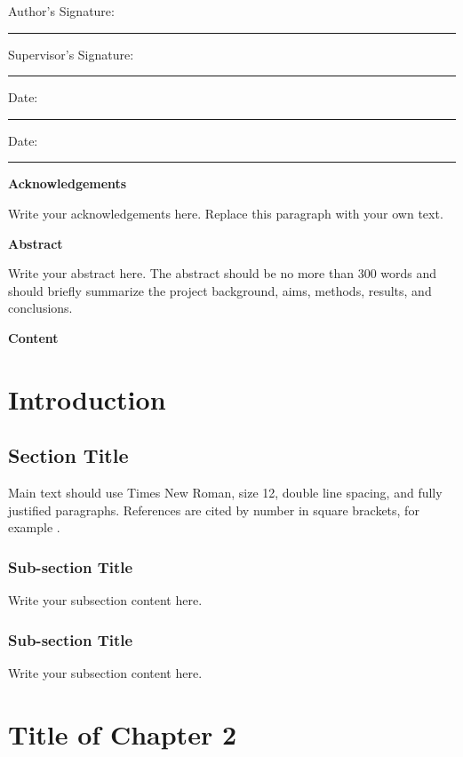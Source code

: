 \documentclass[12pt,a4paper]{report}
\newcommand{\fronttitle}[1]{%
  \clearpage
  \begin{center}
    {\bfseries\fontsize{24}{28}\selectfont #1}
  \end{center}
  \vspace{1em}
}
\newcommand{\signatureline}[1]{%
  \noindent #1\hspace{0.5em}\rule{0.32\textwidth}{0.4pt}
}
\begin{document}
\vspace{3em}
\signatureline{Author's Signature:}
\hfill
\signatureline{Supervisor's Signature:}

\vspace{2em}
\signatureline{Date:}
\hfill
\signatureline{Date:}

\fronttitle{Acknowledgements}

Write your acknowledgements here. Replace this paragraph with your own text.

\fronttitle{Abstract}

Write your abstract here. The abstract should be no more than 300 words and should briefly summarize the project background, aims, methods, results, and conclusions.

\clearpage
\begin{center}
{\bfseries\fontsize{24}{28}\selectfont Content}
\end{center}
\renewcommand{\contentsname}{}
\tableofcontents

\clearpage
\setcounter{page}{1}

\chapter{Introduction}

\section{Section Title}

Main text should use Times New Roman, size 12, double line spacing, and fully justified paragraphs. References are cited by number in square brackets, for example \cite{engel1986}.

\subsection{Sub-section Title}

Write your subsection content here.

\subsection{Sub-section Title}

Write your subsection content here.

\chapter{Title of Chapter 2}
\end{document}
